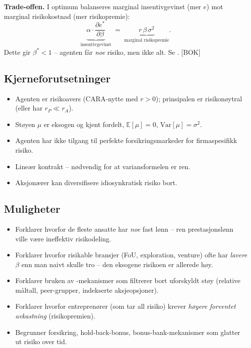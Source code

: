 \textbf{Trade-offen.} I optimum balanseres marginal insentivgevinst (mer $e$) mot marginal risikokostnad (mer risikopremie):
\[
\underbrace{\alpha\cdot\frac{\partial e^{*}}{\partial \beta}}_{\text{insentivgevinst}}\;=\;\underbrace{r\,\beta\,\sigma^{2}}_{\text{marginal risikopremie}}.
\]
Dette gir $\beta^{*}<1$ -- agenten får \emph{noe} risiko, men ikke alt. Se . [BOK]

\subsection*{Kjerneforutsetninger}
\begin{itemize}\setlength{\itemsep}{1pt}
\item Agenten er risikoavers (CARA-nytte med $r>0$); prinsipalen er risikonøytral (eller har $r_P\ll r_A$).
\item Støyen $\mu$ er eksogen og kjent fordelt, $\mathbb{E}[\mu]=0$, $\mathrm{Var}[\mu]=\sigma^{2}$.
\item Agenten har ikke tilgang til perfekte forsikringsmarkeder for firmaspesifikk risiko.
\item Lineær kontrakt -- nødvendig for at variansformelen er ren.
\item Aksjonærer kan diversifisere idiosynkratisk risiko bort.
\end{itemize}

\subsection*{Muligheter}
\begin{itemize}\setlength{\itemsep}{1pt}
\item Forklarer hvorfor de fleste ansatte har \emph{noe} fast lønn -- ren prestasjonslønn ville være ineffektiv risikodeling.
\item Forklarer hvorfor risikable bransjer (FoU, exploration, venture) ofte har \emph{lavere} $\beta$ enn man naivt skulle tro -- den eksogene risikoen er allerede høy.
\item Forklarer bruken av -mekanismer som filtrerer bort uforskyldt støy (relative måltall, peer-grupper, indekserte aksjeopsjoner).
\item Forklarer hvorfor entreprenører (som tar all risiko) krever \emph{høyere forventet avkastning} (risikopremien).
\item Begrunner forsikring, hold-back-bonus, bonus-bank-mekanismer som glatter ut risiko over tid.
\end{itemize}

